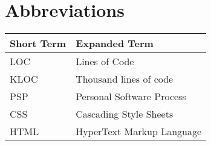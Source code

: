 \chapter{Abbreviations}




\begin{tabular}{p{40mm}|p{100mm}}
	\textbf{Short Term}&\textbf{Expanded Term}\\
	\hline
	LOC		&	Lines of Code\\
	KLOC	&	Thousand lines of code\\
	PSP		& 	Personal Software Process\\
	CSS 		& Cascading Style Sheets\\
	HTML 	& HyperText Markup Language\\
\end{tabular}